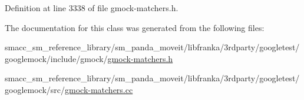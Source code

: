 Definition at line 3338 of file gmock-\/matchers.\+h.



The documentation for this class was generated from the following files\+:\begin{DoxyCompactItemize}
\item 
smacc\+\_\+sm\+\_\+reference\+\_\+library/sm\+\_\+panda\+\_\+moveit/libfranka/3rdparty/googletest/googlemock/include/gmock/\hyperlink{gmock-matchers_8h}{gmock-\/matchers.\+h}\item 
smacc\+\_\+sm\+\_\+reference\+\_\+library/sm\+\_\+panda\+\_\+moveit/libfranka/3rdparty/googletest/googlemock/src/\hyperlink{gmock-matchers_8cc}{gmock-\/matchers.\+cc}\end{DoxyCompactItemize}
